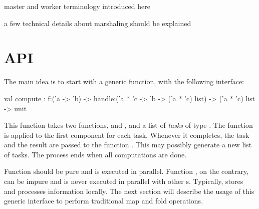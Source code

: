 \documentclass[preprint]{sigplanconf}
\begin{document}
master and worker terminology introduced here

a few technical details about marshaling should be explained

\section{API}\label{sec:API}

The main idea is to start with a generic function, with the
following interface: 
\begin{ocaml}
  val compute : 
    f:('a -> 'b) -> 
    handle:('a * 'c -> 'b -> ('a * 'c) list) -> 
    ('a * 'c) list -> unit
\end{ocaml}
This function takes two functions,  and , and a
list of \emph{tasks} of type .
The function  is applied to the first component for each task.
Whenever it completes, the task and the result are passed to the
function . This may possibly generate a new list of
tasks. The process ends when all computations are done.

Function  should be pure and is executed in parallel.
Function , on the contrary, can be impure and is never
executed in parallel with other s. Typically,
 stores and processes information locally.
The next section will describe the usage of this generic interface to
perform traditional map and fold operations.
\end{document}
